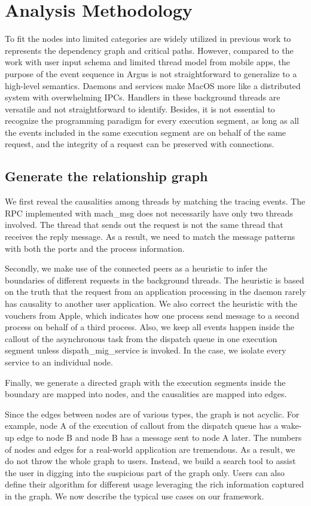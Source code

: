 \section{Analysis Methodology}
To fit the nodes into limited categories are widely utilized in previous work to represents the dependency graph and critical paths\cite{Magpie, AppInsight, Panaappticon}.
However, compared to the work with user input schema and limited thread model from mobile apps, the purpose of the event sequence in Argus is not straightforward to generalize to a high-level semantics.
Daemons and services make MacOS more like a distributed system with overwhelming IPCs.
Handlers in these background threads are versatile and not straightforward to identify.
Besides, it is not essential to recognize the programming paradigm for every execution segment, as long as all the events included in the same execution segment are on behalf of the same request, and the integrity of a request can be preserved with connections.

\subsection{Generate the relationship graph}
We first reveal the causalities among threads by matching the tracing events.
The RPC implemented with mach\_msg does not necessarily have only two threads involved. 
The thread that sends out the request is not the same thread that receives the reply message.
As a result, we need to match the message patterns with both the ports and the process information.

Secondly, we make use of the connected peers as a heuristic to infer the boundaries of different requests in the background threads.
The heuristic is based on the truth that the request from an application processing in the daemon rarely has causality to another user application.
We also correct the heuristic with the vouchers from Apple, which indicates how one process send message to a second process on behalf of a third process. 
Also, we keep all events happen inside the callout of the asynchronous task from the dispatch queue in one execution segment unless dispath\_mig\_service is invoked.
In the case, we isolate every service to an individual node.

Finally, we generate a directed graph with the execution segments inside the boundary are mapped into nodes, and the causalities are mapped into edges.

Since the edges between nodes are of various types, the graph is not acyclic.
For example, node A of the execution of callout from the dispatch queue has a wake-up edge to node B and node B has a message sent to node A later.
The numbers of nodes and edges for a real-world application are tremendous.
As a result, we do not throw the whole graph to users.
Instead, we build a search tool to assist the user in digging into the suspicious part of the graph only.                Users can also define their algorithm for different usage leveraging the rich information captured in the graph. 
We now describe the typical use cases on our framework.

